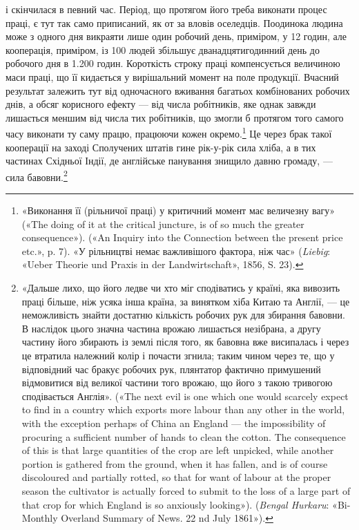 \parcont{}  %
і скінчилася в певний час. Період, що протягом його треба виконати
процес праці, є тут так само приписаний, як от за вловів
оселедців. Поодинока людина може з одного дня викраяти лише
один робочий день, приміром, у 12 годин, але кооперація, приміром,
із 100 людей збільшує дванадцятигодинний день до робочого
дня в 1.200 годин. Короткість строку праці компенсується
величиною маси праці, що її кидається у вирішальний момент
на поле продукції. Вчасний результат залежить тут від одночасного
вживання багатьох комбінованих робочих днів, а обсяг
корисного ефекту — від числа робітників, яке однак завжди
лишається меншим від числа тих робітників, що змогли б протягом
того самого часу виконати ту саму працю, працюючи кожен
окремо.\footnote{
«Виконання її (рільничої праці) у критичний момент має величезну
вагу» («The doing of it at the critical juncture, is of so much the
greater consequence»). («An Inquiry into the Connection between the present
price etc.», p. 7). «У рільництві немає важливішого фактора, ніж час»
(\emph{Liebig}: «Ueber Theorie und Praxis in der Landwirtschaft», 1856, S. 23).
} Це через брак такої кооперації на заході Сполучених
штатів гине рік-у-рік сила хліба, а в тих частинах Східньої
Індії, де англійське панування знищило давню громаду, — сила
бавовни.\footnote{
«Дальше лихо, що його ледве чи хто міг сподіватись у країні,
яка вивозить праці більше, ніж усяка інша країна, за винятком хіба
Китаю та Англії, — це неможливість знайти достатню кількість робочих
рук для збирання бавовни. В наслідок цього значна частина врожаю лишається
незібрана, а другу частину його збирають із землі після того, як
бавовна вже висипалась і через це втратила належний колір і почасти
згнила; таким чином через те, що у відповідний час бракує робочих рук,
плянтатор фактично примушений відмовитися від великої частини того
врожаю, що його з такою тривогою сподівається Англія». («The next
evil is one which one would scarcely expect to find in a country which exports
more labour than any other in the world, with the exception perhaps of
China an England — the impossibility of procuring a sufficient number of
hands to clean the cotton. The consequence of this is that large quantities of
the crop are left unpicked, while another portion is gathered from the ground,
when it has fallen, and is of course discoloured and partially rotted, so
that for want of labour at the proper season the cultivator is actually forced
to submit to the loss of a large part of that crop for which England is so
anxiously looking»). (\emph{Bengal Hurkaru}: «Bi-Monthly Overland Summary
of News. 22 nd July 1861»).
}

